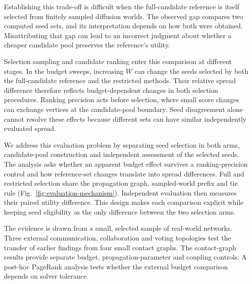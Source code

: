 \documentclass[smallextended]{svjour3}
\begin{document}
Establishing this trade-off is difficult when the full-candidate reference is itself selected from finitely sampled diffusion worlds. The observed gap compares two computed seed sets, and its interpretation depends on how both were obtained. Misattributing that gap can lead to an incorrect judgment about whether a cheaper candidate pool preserves the reference's utility.

Selection sampling and candidate ranking enter this comparison at different stages. In the budget sweeps, increasing $W$ can change the seeds selected by both the full-candidate reference and the restricted methods. Their relative spread difference therefore reflects budget-dependent changes in both selection procedures. Ranking precision acts before selection, where small score changes can exchange vertices at the candidate-pool boundary. Seed disagreement alone cannot resolve these effects because different sets can have similar independently evaluated spread.

We address this evaluation problem by separating seed selection in both arms, candidate-pool construction and independent assessment of the selected seeds. The analysis asks whether an apparent budget effect survives a ranking-precision control and how reference-set changes translate into spread differences. Full and restricted selection share the propagation graph, sampled-world prefix and tie rule (Fig.~\ref{fig:evaluation-mechanism}). Independent evaluation then measures their paired utility difference. This design makes each comparison explicit while keeping seed eligibility as the only difference between the two selection arms.

The evidence is drawn from a small, selected sample of real-world networks. Three external communication, collaboration and voting topologies test the transfer of earlier findings from four small contact graphs. The contact-graph results provide separate budget, propagation-parameter and coupling controls. A post-hoc PageRank analysis tests whether the external budget comparison depends on solver tolerance.
\end{document}
